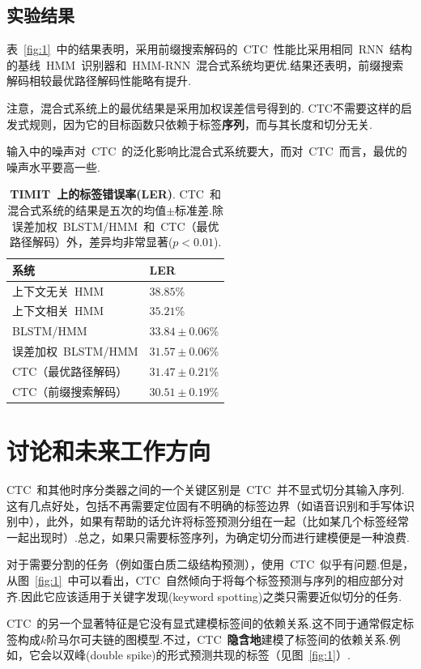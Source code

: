 \documentclass{ctexart}
\begin{document}
\subsection{实验结果}
表~\ref{fig:1}~中的结果表明，采用前缀搜索解码的~CTC~性能比采用相同~RNN~结构的基线~HMM~识别器和~HMM-RNN~混合式系统均更优.结果还表明，前缀搜索解码相较最优路径解码性能略有提升.

注意，混合式系统上的最优结果是采用加权误差信号得到的. CTC不需要这样的启发式规则，因为它的目标函数只依赖于标签\textbf{序列}，而与其长度和切分无关.

输入中的噪声对~CTC~的泛化影响比混合式系统要大，而对~CTC~而言，最优的噪声水平要高一些.
\begin{table}
	\centering
	\caption{\textbf{TIMIT~上的标签错误率(LER)}. CTC~和混合式系统的结果是五次的均值$\pm$标准差.除误差加权~BLSTM/HMM~和~CTC（最优路径解码）外，差异均非常显著($p<0.01$).}
	\label{table:1}
	\begin{tabular}{ll}
		\hline
		系统            & LER \\ \hline
		上下文无关~HMM      &  $38.85$\%   \\
		上下文相关~HMM      &  $35.21$\%   \\
		BLSTM/HMM     &  $33.84\pm 0.06$\%   \\
		误差加权~BLSTM/HMM &  $31.57\pm 0.06$\%   \\
		CTC（最优路径解码）   &  $31.47\pm 0.21$\%   \\
		CTC（前缀搜索解码）   &  $30.51\pm 0.19$\%  \\ \hline
	\end{tabular}
\end{table}
\section{讨论和未来工作方向}
\label{sec:discussion}
CTC~和其他时序分类器之间的一个关键区别是~CTC~并不显式切分其输入序列.这有几点好处，包括不再需要定位固有不明确的标签边界（如语音识别和手写体识别中），此外，如果有帮助的话允许将标签预测分组在一起（比如某几个标签经常一起出现时）.总之，如果只需要标签序列，为确定切分而进行建模便是一种浪费.

对于需要分割的任务（例如蛋白质二级结构预测），使用~CTC~似乎有问题.但是，从图~\ref{fig:1}~中可以看出，CTC~自然倾向于将每个标签预测与序列的相应部分对齐.因此它应该适用于关键字发现(keyword spotting)之类只需要近似切分的任务.

CTC~的另一个显著特征是它没有显式建模标签间的依赖关系.这不同于通常假定标签构成$k$阶马尔可夫链的图模型.不过，CTC~\textbf{隐含地}建模了标签间的依赖关系.例如，它会以双峰(double spike)的形式预测共现的标签（见图~\ref{fig:1}）.
\end{document}
